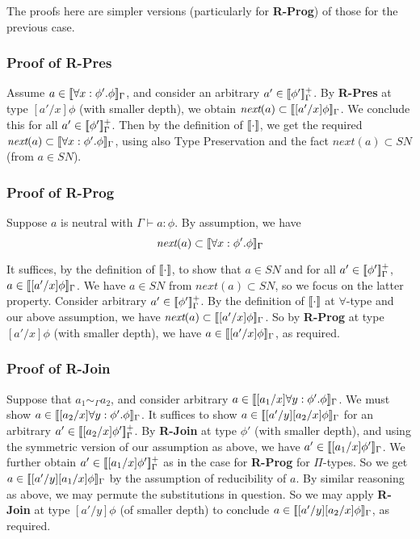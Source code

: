 \documentclass[copyright]{eptcs}
\newcommand{\next}[0]{\textit{next}}
\newcommand{\SN}[0]{\textit{SN}}
\newcommand{\interp}[1]{[\negthinspace[#1]\negthinspace]}
\begin{document}
The proofs here are simpler versions (particularly for
\textbf{R-Prog}) of those for the previous case.

\subsubsection{Proof of \textbf{R-Pres}}

Assume $a\in\interp{\forall x:\phi'.\phi}_\Gamma$, and consider an
arbitrary $a'\in\interp{\phi'}^+_\Gamma$.  By \textbf{R-Pres} at type
$[a'/x]\phi$ (with smaller depth), we obtain
$\next(a)\subset\interp{[a'/x]\phi}_\Gamma$.  We conclude this for all
$a'\in\interp{\phi'}^+_\Gamma$.  Then by the definition of
$\interp{\cdot}$, we get the required $\next(a)\subset\interp{\forall
  x:\phi'.\phi}_\Gamma$, using also Type Preservation and the fact
$\next(a)\subset\SN$ (from $a\in\SN$).

\subsubsection{Proof of \textbf{R-Prog}}

Suppose $a$ is neutral with $\Gamma\vdash a:\phi$.  By assumption, we have
\[
\next(a) \subset \interp{\forall x:\phi'.\phi}_\Gamma 
\]

\noindent It suffices, by the definition of $\interp{\cdot}$, to show
that $a\in\SN$ and for all $a'\in\interp{\phi'}^+_\Gamma$,
$a\in\interp{[a'/x]\phi}_\Gamma$. We have $a\in\SN$ from
$\next(a)\subset\SN$, so we focus on the latter property.  Consider
arbitrary $a'\in\interp{\phi'}^+_\Gamma$.  By the definition of
$\interp{\cdot}$ at $\forall$-type and our above assumption, we have
$\next(a)\subset\interp{[a'/x]\phi}_\Gamma$.  So by \textbf{R-Prog} at
type $[a'/x]\phi$ (with smaller depth), we have
$a\in\interp{[a'/x]\phi}_\Gamma$, as required.

\subsubsection{Proof of \textbf{R-Join}}

Suppose that $a_1\sim_\Gamma a_2$, and consider arbitrary
$a\in\interp{[a_1/x]\forall y:\phi'.\phi}_\Gamma$.  We must show
$a\in\interp{[a_2/x]\forall y:\phi'.\phi}_\Gamma$.  It suffices to
show $a\in\interp{[a'/y][a_2/x]\phi}_\Gamma$ for an arbitrary
$a'\in\interp{[a_2/x]\phi'}^+_\Gamma$.  By \textbf{R-Join} at type
$\phi'$ (with smaller depth), and using the symmetric version of our
assumption as above, we have $a'\in\interp{[a_1/x]\phi'}_\Gamma$.  We
further obtain $a'\in\interp{[a_1/x]\phi'}^+_\Gamma$ as in the case
for \textbf{R-Prog} for $\Pi$-types.  So we get
$a\in\interp{[a'/y][a_1/x]\phi}_\Gamma$ by the assumption of
reducibility of $a$.  By similar reasoning as above, we may permute
the substitutions in question.  So we may apply \textbf{R-Join} at
type $[a'/y]\phi$ (of smaller depth) to conclude
$a\in\interp{[a'/y][a_2/x]\phi}_\Gamma$, as required.
\end{document}
